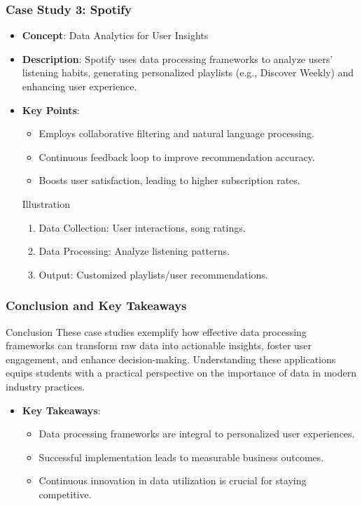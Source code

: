 \documentclass{beamer}
\begin{document}
\begin{frame}[fragile]
    \frametitle{Case Study 3: Spotify}
    \begin{itemize}
        \item \textbf{Concept}: Data Analytics for User Insights
        \item \textbf{Description}: Spotify uses data processing frameworks to analyze users' listening habits, generating personalized playlists (e.g., Discover Weekly) and enhancing user experience.
        \item \textbf{Key Points}:
        \begin{itemize}
            \item Employs collaborative filtering and natural language processing.
            \item Continuous feedback loop to improve recommendation accuracy.
            \item Boosts user satisfaction, leading to higher subscription rates.
        \end{itemize}
        \begin{block}{Illustration}
            \begin{enumerate}
                \item Data Collection: User interactions, song ratings.
                \item Data Processing: Analyze listening patterns.
                \item Output: Customized playlists/user recommendations.
            \end{enumerate}
        \end{block}
    \end{itemize}
\end{frame}

\begin{frame}[fragile]
    \frametitle{Conclusion and Key Takeaways}
    \begin{block}{Conclusion}
        These case studies exemplify how effective data processing frameworks can transform raw data into actionable insights, foster user engagement, and enhance decision-making. Understanding these applications equips students with a practical perspective on the importance of data in modern industry practices.
    \end{block}
    \begin{itemize}
        \item \textbf{Key Takeaways}:
        \begin{itemize}
            \item Data processing frameworks are integral to personalized user experiences.
            \item Successful implementation leads to measurable business outcomes.
            \item Continuous innovation in data utilization is crucial for staying competitive.
        \end{itemize}
    \end{itemize}
\end{frame}
\end{document}
